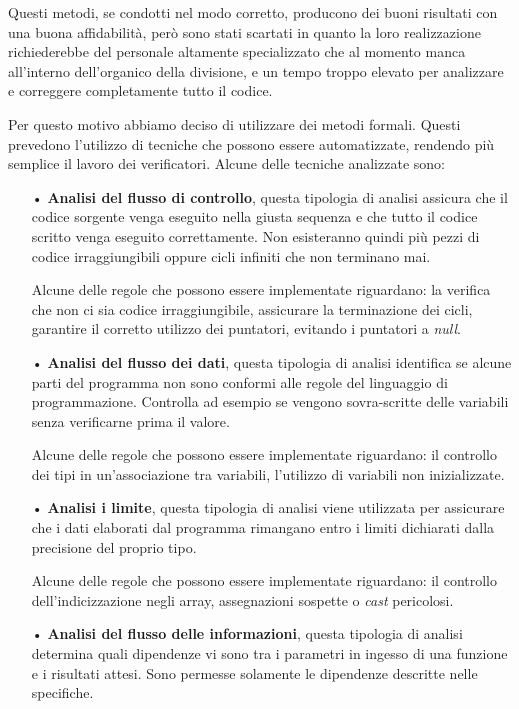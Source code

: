 Questi metodi, se condotti nel modo corretto, producono dei buoni risultati con una buona affidabilità, però sono stati scartati in quanto la loro realizzazione richiederebbe del personale altamente specializzato che al momento manca all'interno dell'organico della divisione, e un tempo troppo elevato per analizzare e correggere completamente tutto il codice.

Per questo motivo abbiamo deciso di utilizzare dei metodi formali. Questi prevedono l'utilizzo di tecniche che possono essere automatizzate, rendendo più semplice il lavoro dei verificatori. Alcune delle tecniche analizzate sono:
\begin{itemize}
\item[•] \textbf{Analisi del flusso di controllo}, questa tipologia di analisi assicura che il codice sorgente venga eseguito nella giusta sequenza e che tutto il codice scritto venga eseguito correttamente. Non esisteranno quindi più pezzi di codice irraggiungibili oppure cicli infiniti che non terminano mai.

Alcune delle regole che possono essere implementate riguardano: la verifica che non ci sia codice irraggiungibile, assicurare la terminazione dei cicli, garantire il corretto utilizzo dei puntatori, evitando i puntatori a \textit{null}.

\item[•] \textbf{Analisi del flusso dei dati}, questa tipologia di analisi identifica se alcune parti del programma non sono conformi alle regole del linguaggio di programmazione. Controlla ad esempio se vengono sovra-scritte delle variabili senza verificarne prima il valore.

Alcune delle regole che possono essere implementate riguardano: il controllo dei tipi in un'associazione tra variabili, l'utilizzo di variabili non inizializzate.

\item[•] \textbf{Analisi i limite}, questa tipologia di analisi viene utilizzata per assicurare che i dati elaborati dal programma rimangano entro i limiti dichiarati dalla precisione del proprio tipo.

Alcune delle regole che possono essere implementate riguardano: il controllo dell'indicizzazione negli array, assegnazioni sospette o \textit{cast} pericolosi.

\item[•] \textbf{Analisi del flusso delle informazioni}, questa tipologia di analisi determina quali dipendenze vi sono tra i parametri in ingesso di una funzione e i risultati attesi. Sono permesse solamente le dipendenze descritte nelle specifiche.

\end{itemize}

